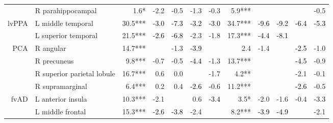 \documentclass[]{article}
\begin{document}
\begin{table}[ht]
{\begin{tabular}{rlrrrrrrrrrr}
   & R parahippocampal & 1.6* & -2.2 & -0.5 & -1.3 & -0.3 & 5.9*** & \cellcolor{red}\textcolor{white}{-3.7} & \cellcolor{red}\textcolor{white}{-2.5} & \cellcolor{red}\textcolor{white}{-4.0} & -0.5 \\ 
  lvPPA & L middle temporal & 30.5*** & \cellcolor{green}\textcolor{black}{-3.0} & \cellcolor{green}\textcolor{black}{-7.3} & \cellcolor{green}\textcolor{black}{-3.2} & \cellcolor{green}\textcolor{black}{-3.0} & 34.7*** & \cellcolor{green}\textcolor{black}{-9.6} & \cellcolor{green}\textcolor{black}{-9.2} & \cellcolor{green}\textcolor{black}{-6.4} & \cellcolor{green}\textcolor{black}{-5.3} \\ 
   & L superior temporal & 21.5*** & \cellcolor{green}\textcolor{black}{-2.6} & \cellcolor{green}\textcolor{black}{-6.8} & -2.3 & -1.8 & 17.3*** & \cellcolor{green}\textcolor{black}{-4.4} & \cellcolor{green}\textcolor{black}{-8.1} & \cellcolor{red}\textcolor{white}{-3.7} & \cellcolor{red}\textcolor{white}{-2.8} \\ 
  PCA & R angular & 14.7*** & \cellcolor{blue}\textcolor{white}{-2.8} & -1.3 & \cellcolor{green}\textcolor{black}{-3.9} & \cellcolor{blue}\textcolor{white}{-3.0} & 2.4 & -1.4 & \cellcolor{red}\textcolor{white}{-2.6} & \cellcolor{green}\textcolor{black}{-2.5} & -1.0 \\ 
   & R precuneus & 9.8*** & -0.7 & -0.5 & \cellcolor{green}\textcolor{black}{-4.4} & -1.3 & 13.7*** & \cellcolor{red}\textcolor{white}{-6.5} & \cellcolor{red}\textcolor{white}{-4.8} & \cellcolor{green}\textcolor{black}{-4.5} & -0.9 \\ 
   & R superior parietal lobule & 16.7*** & 0.6 & 0.0 & \cellcolor{blue}\textcolor{white}{-5.5} & -1.7 & 4.2** & \cellcolor{red}\textcolor{white}{-3.6} & \cellcolor{red}\textcolor{white}{-2.7} & -2.1 & -0.1 \\ 
   & R supramarginal & 6.4*** & 0.2 & 0.4 & \cellcolor{green}\textcolor{black}{-2.6} & -0.6 & 11.2*** & \cellcolor{red}\textcolor{white}{-6.5} & \cellcolor{red}\textcolor{white}{-3.1} & \cellcolor{green}\textcolor{black}{-2.6} & -0.5 \\ 
  fvAD & L anterior insula & 10.3*** & -2.1 & \cellcolor{blue}\textcolor{white}{-2.6} & 0.6 & \cellcolor{green}\textcolor{black}{-3.4} & 3.5* & -2.0 & -1.6 & -0.4 & \cellcolor{green}\textcolor{black}{-3.3} \\ 
   & L middle frontal & 15.3*** & \cellcolor{green}\textcolor{black}{-2.6} & \cellcolor{green}\textcolor{black}{-3.8} & -2.4 & \cellcolor{blue}\textcolor{white}{-4.4} & 8.2*** & \cellcolor{green}\textcolor{black}{-3.9} & \cellcolor{green}\textcolor{black}{-4.9} & \cellcolor{red}\textcolor{white}{-3.8} & -2.1 \\ 

\end{tabular}}
\end{table}
\end{document}
